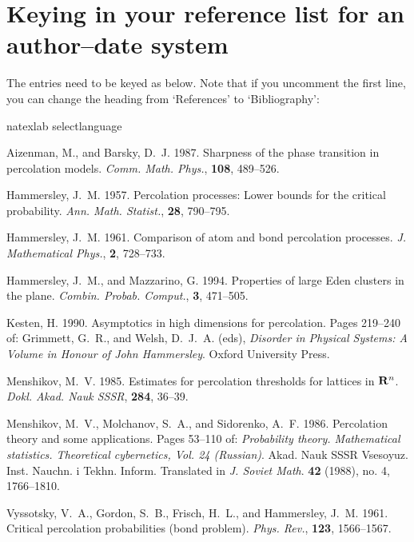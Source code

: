 \section{Keying in your reference list for an author--date system}
\label{authordatebiblio}

The entries need to be keyed as below. Note that if you uncomment the first line, you can change the heading from `References' to `Bibliography':
%
\begin{smallverbatim}
  \begin{thebibliography}{8}
    \expandafter\ifx\csname natexlab\endcsname\relax
      \def\natexlab#1{#1}\fi
    \expandafter\ifx\csname selectlanguage\endcsname\relax
      \def\selectlanguage#1{\relax}\fi

    Aizenman, M., and Barsky, D.~J. 1987.
    Sharpness of the phase transition in percolation models.
    {\em Comm. Math. Phys.}, {\bf 108}, 489--526.

    Hammersley, J.~M. 1957.
    Percolation processes: Lower bounds for the critical probability.
    {\em Ann. Math. Statist.}, {\bf 28}, 790--795.

    Hammersley, J.~M. 1961.
    Comparison of atom and bond percolation processes.
    {\em J. Mathematical Phys.}, {\bf 2}, 728--733.

    Hammersley, J.~M., and Mazzarino, G. 1994.
    Properties of large Eden clusters in the plane.
    {\em Combin. Probab. Comput.}, {\bf 3}, 471--505.

    Kesten, H. 1990.
    Asymptotics in high dimensions for percolation.
    Pages  219--240 of: Grimmett, G.~R., and Welsh, D.~J.~A. (eds),
    {\em Disorder in Physical Systems: A Volume in Honour of John Hammersley}.
    Oxford University Press.

    Menshikov, M.~V. 1985.
    Estimates for percolation thresholds for lattices in {${\bf R}\sp n$}.
    {\em Dokl. Akad. Nauk SSSR}, {\bf 284}, 36--39.

    Menshikov, M.~V., Molchanov, S.~A., and Sidorenko, A.~F. 1986.
    Percolation theory and some applications.
    Pages  53--110 of: {\em Probability theory. Mathematical
    statistics. Theoretical cybernetics, Vol. 24 (Russian)}.
    Akad. Nauk SSSR Vsesoyuz. Inst. Nauchn. i Tekhn. Inform.
    Translated in {\em J. Soviet Math}. {\bf 42} (1988), no. 4,
    1766--1810.

    Vyssotsky, V.~A., Gordon, S.~B., Frisch, H.~L., and Hammersley, J.~M. 1961.
    Critical percolation probabilities (bond problem).
    {\em Phys. Rev.}, {\bf 123}, 1566--1567.

  \end{thebibliography}
\end{smallverbatim}

